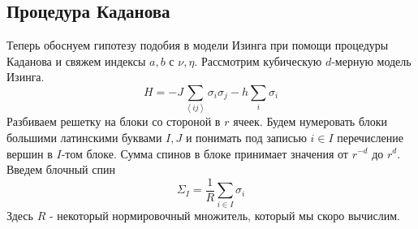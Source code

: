 \documentclass[a4paper,12pt]{article}
\theoremstyle{definition}
\theoremstyle{definition}
\theoremstyle{definition}
\begin{document}
\subsection{Процедура Каданова}
\label{sec:kadanoff-procedure}
Теперь обоснуем гипотезу подобия в модели Изинга при помощи процедуры Каданова и свяжем индексы $a,b$ с $\nu,\eta$.
Рассмотрим кубическую $d$-мерную модель Изинга.
\begin{equation}
  \label{eq:40}
  H=-J\sum_{\left<ij\right>}\sigma_i \sigma_j-h\sum_i \sigma_i
\end{equation}
Разбиваем решетку на блоки со стороной в $r$ ячеек. Будем нумеровать блоки большими латинскими буквами $I,J$ и понимать под записью $i\in I$ перечисление вершин в $I$-том блоке.
Сумма спинов в блоке принимает значения от $r^{-d}$ до $r^d$. Введем блочный спин
\begin{equation}
  \label{eq:41}
  \Sigma_I=\frac{1}{R}\sum_{i\in I}\sigma_i
\end{equation}
Здесь $R$ - некоторый нормировочный множитель, который мы скоро вычислим.
\end{document}
